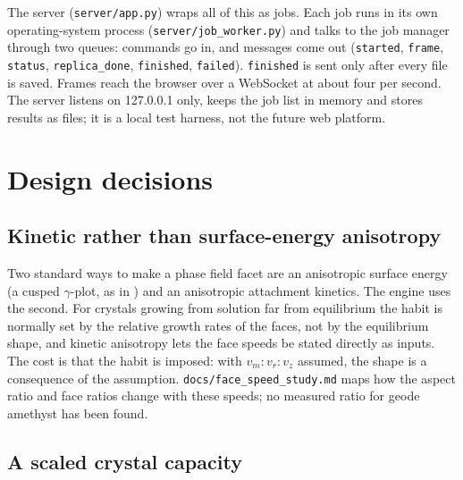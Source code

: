 \documentclass[11pt,a4paper]{article}
\newcommand{\code}[1]{\texttt{#1}}
\begin{document}
The server (\code{server/app.py}) wraps all of this as jobs. Each job runs in its own operating-system process (\code{server/job\_worker.py}) and talks to the job manager through two queues: commands go in, and messages come out (\code{started}, \code{frame}, \code{status}, \code{replica\_done}, \code{finished}, \code{failed}). \code{finished} is sent only after every file is saved. Frames reach the browser over a WebSocket at about four per second. The server listens on 127.0.0.1 only, keeps the job list in memory and stores results as files; it is a local test harness, not the future web platform.

\section{Design decisions}\label{sec:decisions}

\subsection{Kinetic rather than surface-energy anisotropy}

Two standard ways to make a phase field facet are an anisotropic surface energy (a cusped $\gamma$-plot, as in \citep{Debierre2003}) and an anisotropic attachment kinetics. The engine uses the second. For crystals growing from solution far from equilibrium the habit is normally set by the relative growth rates of the faces, not by the equilibrium shape, and kinetic anisotropy lets the face speeds be stated directly as inputs. The cost is that the habit is imposed: with $v_m:v_r:v_z$ assumed, the shape is a consequence of the assumption. \code{docs/face\_speed\_study.md} maps how the aspect ratio and face ratios change with these speeds; no measured ratio for geode amethyst has been found.

\subsection{A scaled crystal capacity}
\end{document}
